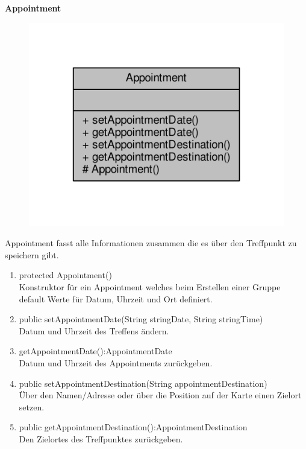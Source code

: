 \textbf{Appointment}
\begin{figure}[H]
	\includegraphics[scale = 1]{res/umlClasses/appointment__coll__graph.pdf}
	\centering
\end{figure}
Appointment fasst alle Informationen zusammen die es über den Treffpunkt zu speichern gibt.
\begin{enumerate}
	\item protected Appointment()\\	
		Konstruktor für ein Appointment welches beim Erstellen einer Gruppe default Werte für Datum, Uhrzeit und Ort definiert.
	\item public setAppointmentDate(String stringDate, String stringTime)\\
		Datum und Uhrzeit des Treffens ändern.
	\item getAppointmentDate():AppointmentDate \\
		Datum und Uhrzeit des Appointments zurückgeben.
	\item public setAppointmentDestination(String appointmentDestination)\\
		Über den Namen/Adresse oder über die Position auf der Karte einen Zielort setzen.
	\item public getAppointmentDestination():AppointmentDestination\\
		Den Zielortes des Treffpunktes zurückgeben.
\end{enumerate}

